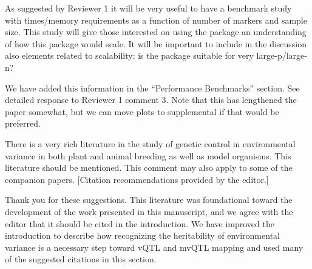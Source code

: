\documentclass[11pt]{article}
\newcommand{\EditorQuestion}[1]{
  \vspace{5pt}\goodbreak
  \noindent\fbox{Editor:} #1
  \normalfont\par
}
\newcommand{\Response}[1]{
  \goodbreak
  \textcolor{blue!50!black}{#1}
  \normalfont\par
}
\begin{document}
\EditorQuestion{
  As suggested by Reviewer 1 it will be very useful to have a benchmark study with times/memory requirements as a function of number of markers and sample size.
  This study will give those interested on using the package an understanding of how this package would scale.
  It will be important to include in the discussion also elements related to scalability: is the package suitable for very large-p/large-n? 
}
\Response{
  We have added this information in the ``Performance Benchmarks'' section. 
  See detailed response to Reviewer 1 comment 3. 
  Note that this has lengthened the paper somewhat, but we can move plots to supplemental if that would be preferred.
}


\EditorQuestion{
  There is a very rich literature in the study of genetic control in environmental variance in both plant and animal breeding as well as model organisms.
  This literature should be mentioned. This comment may also apply to some of the companion papers.
  [Citation recommendations provided by the editor.]
}
\Response{
  Thank you for these suggestions. 
  This literature was foundational toward the development of the work presented in this manuscript, and we agree with the editor that it should be cited in the introduction.
  We have improved the introduction to describe how recognizing the heritability of environmental variance is a necessary step toward vQTL and mvQTL mapping and used many of the suggested citations in this section.
}






\end{document}
